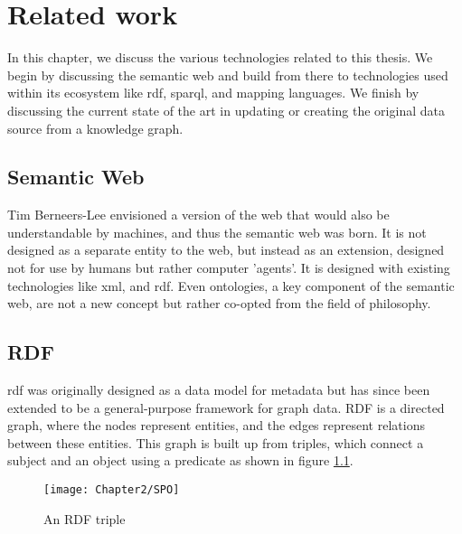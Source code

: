 
\chapter{Related work}
\label{chapter:related_work}

In this chapter, we discuss the various technologies related to this thesis. We begin by discussing the semantic web and build from there to technologies used within its ecosystem like \acrshort{rdf}, \acrshort{sparql}, and mapping languages. We finish by discussing the current state of the art in updating or creating the original data source from a knowledge graph.

\section{Semantic Web}
Tim Berneers-Lee envisioned a version of the web that would also be understandable by machines, and thus the semantic web was born. It is not designed as a separate entity to the web, but instead as an extension, designed not for use by humans but rather computer 'agents'. It is designed with existing technologies like \acrshort{xml},  and \acrshort{rdf}. Even ontologies, a key component of the semantic web, are not a new concept but rather co-opted from the field of philosophy. \citep{thesemanticweb}

\section{RDF}
\acrfull{rdf} was originally designed as a data model for metadata but has since been extended to be a general-purpose framework for graph data. RDF is a directed graph, where the nodes represent entities, and the edges represent relations between these entities. This graph is built up from triples, which connect a subject and an object using a predicate as shown in figure \ref{fig:rdf_triple}.

\begin{figure}
    \centering
    \texttt{[image: Chapter2/SPO]}
    \caption{An RDF triple}
    \label{fig:rdf_triple}
\end{figure}


